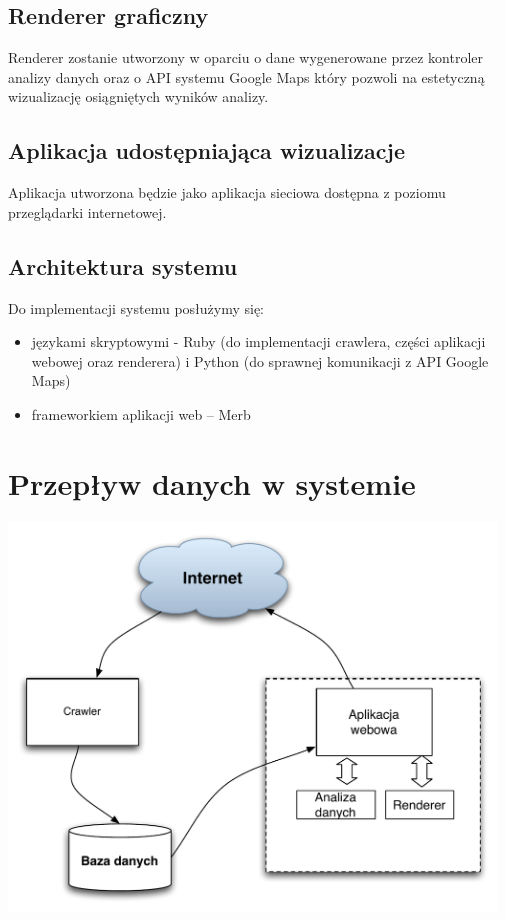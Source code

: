 \documentclass[12pt]{article}
\begin{document}
\subsection{Renderer graficzny}
Renderer zostanie utworzony w oparciu o dane wygenerowane przez kontroler
analizy danych oraz o API systemu Google Maps który pozwoli na estetyczną
wizualizację osiągniętych wyników analizy.

\subsection{Aplikacja udostępniająca wizualizacje}
Aplikacja utworzona będzie jako aplikacja sieciowa dostępna z poziomu
przeglądarki internetowej.

\subsection{Architektura systemu}
Do implementacji systemu posłużymy się:
\begin{itemize}
\item językami skryptowymi - Ruby (do implementacji crawlera, części aplikacji
    webowej oraz renderera) i Python (do sprawnej komunikacji z API Google
      Maps)
\item frameworkiem aplikacji web -- Merb
\end{itemize}


\section{Przepływ danych w systemie}
\includegraphics[width=35em]{images/data_flow_diagram.pdf}
\end{document}
